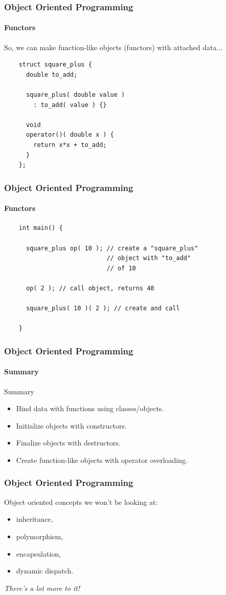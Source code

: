 \documentclass{beamer}
\begin{document}
\begin{frame}[fragile]
  \frametitle{Object Oriented Programming}
  \framesubtitle{Functors}
  So, we can make function-like objects (functors) with attached data...
  \begin{example}
    \begin{lstlisting}
    struct square_plus {
      double to_add;

      square_plus( double value )
        : to_add( value ) {}

      void
      operator()( double x ) {
        return x*x + to_add;
      }
    };
    \end{lstlisting}
  \end{example}
\end{frame}

\begin{frame}[fragile]
  \frametitle{Object Oriented Programming}
  \framesubtitle{Functors}
  \begin{example}
    \begin{lstlisting}
    int main() {

      square_plus op( 10 ); // create a "square_plus"
                            // object with "to_add"
                            // of 10

      op( 2 ); // call object, returns 40

      square_plus( 10 )( 2 ); // create and call

    }
    \end{lstlisting}
  \end{example}
\end{frame}

\begin{frame}
  \frametitle{Object Oriented Programming}
  \framesubtitle{Summary}
  \begin{block}{Summary}
  \begin{itemize}
    \item Bind data with functions using classes/objects.
    \item Initialize objects with constructors.
    \item Finalize objects with destructors.
    \item Create function-like objects with operator overloading.
  \end{itemize}
  \end{block}
\end{frame}

\begin{frame}[fragile]
  \frametitle{Object Oriented Programming}
  Object oriented concepts we won't be looking at:
  \begin{itemize}
    \item inheritance,
    \item polymorphism,
    \item encapsulation,
    \item dynamic dispatch.
  \end{itemize}
  \vspace{.5cm}
  \emph{There's a lot more to it!}
\end{frame}
\end{document}
